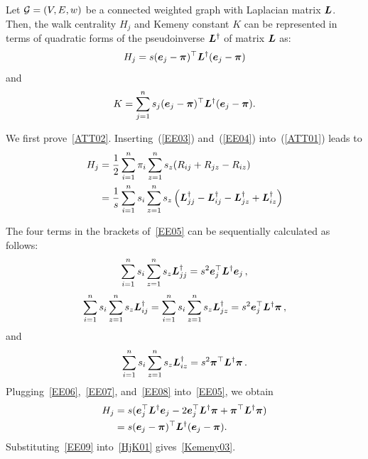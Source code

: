 \documentclass[journal]{IEEEtran}
\begin{document}
\begin{lemma}
    \label{HjK} Let \(\mathcal{G}=(V,E,w)\) be a connected weighted graph  with  Laplacian matrix \(\boldsymbol{L}\). Then, the walk centrality \(H_j\) and Kemeny constant \(K\) can be represented  in terms of quadratic forms of the pseudoinverse \(\boldsymbol{L}^{\dagger}\)  of   matrix  \(\boldsymbol{L}\) as:
    \begin{equation}\label{ATT02}
        H_j=s(\boldsymbol{e}_j - \boldsymbol{\pi})^{\top} \boldsymbol{L}^{\dagger} (\boldsymbol{e}_j - \boldsymbol{\pi})
    \end{equation}
    and
    \begin{equation}\label{Kemeny03}
        K= \sum_{j=1}^{n} s_j (\boldsymbol{e}_j - \boldsymbol{\pi})^{\top} \boldsymbol{L}^{\dagger} (\boldsymbol{e}_j - \boldsymbol{\pi}).
    \end{equation}
\end{lemma}
\begin{IEEEproof}
    We first prove~\eqref{ATT02}. Inserting~(\ref{EE03}) and~(\ref{EE04}) into~(\ref{ATT01}) leads to
    \begin{equation}\label{EE05}
        \begin{split}
            H_j&=\frac{1}{2} \sum_{i=1}^{n} \pi_i \sum_{z=1}^{n} s_z(R_{ij}+R_{jz}-R_{iz}) \\
            &=\frac{1}{s} \sum_{i=1}^{n} s_i \sum_{z=1}^{n} s_z \left({\boldsymbol{L}}_{jj}^{\dagger}-{\boldsymbol{L}}_{ij}^{\dagger}-{\boldsymbol{L}}_{jz}^{\dagger}+{\boldsymbol{L}}_{iz}^{\dagger}\right) \\
        \end{split}
    \end{equation}

    The four terms in the brackets of~\eqref{EE05} can be sequentially calculated as follows:
    \begin{equation}\label{EE06}
        \sum_{i=1}^{n} s_i \sum_{z=1}^{n} s_z {\boldsymbol{L}}_{jj}^{\dagger}=s^2 \boldsymbol{e}_j^{\top} \boldsymbol{L}^{\dagger} \boldsymbol{e}_j\,,
    \end{equation}
    \begin{equation}\label{EE07}
        \sum_{i=1}^{n} s_i \sum_{z=1}^{n} s_z {\boldsymbol{L}}_{ij}^{\dagger}=\sum_{i=1}^{n} s_i \sum_{z=1}^{n} s_z {\boldsymbol{L}}_{jz}^{\dagger}=s^2 \boldsymbol{e}_j^{\top} \boldsymbol{L}^{\dagger} \boldsymbol{\pi}\,,
    \end{equation}
    and
    \begin{equation}\label{EE08}
        \sum_{i=1}^{n} s_i  \sum_{z=1}^{n} s_z {\boldsymbol{L}}_{iz}^{\dagger}=s^2 \boldsymbol{\pi}^{\top} \boldsymbol{L}^{\dagger} \boldsymbol{\pi} \,.
    \end{equation}
    Plugging~\eqref{EE06},~\eqref{EE07}, and~\eqref{EE08}  into~\eqref{EE05}, we obtain
    \begin{equation}\label{EE09}
        \begin{split}
            H_j&=s(\boldsymbol{e}_j^{\top} \boldsymbol{L}^{\dagger} \boldsymbol{e}_j - 2 \boldsymbol{e}_j^{\top} \boldsymbol{L}^{\dagger} \boldsymbol{\pi} + \boldsymbol{\pi}^{\top} \boldsymbol{L}^{\dagger} \boldsymbol{\pi}) \\
            &=s(\boldsymbol{e}_j - \boldsymbol{\pi})^{\top} \boldsymbol{L}^{\dagger} (\boldsymbol{e}_j - \boldsymbol{\pi}).
        \end{split}
    \end{equation}
    Substituting~\eqref{EE09}  into~\eqref{HjK01} gives~\eqref{Kemeny03}.
\end{IEEEproof}
\end{document}
